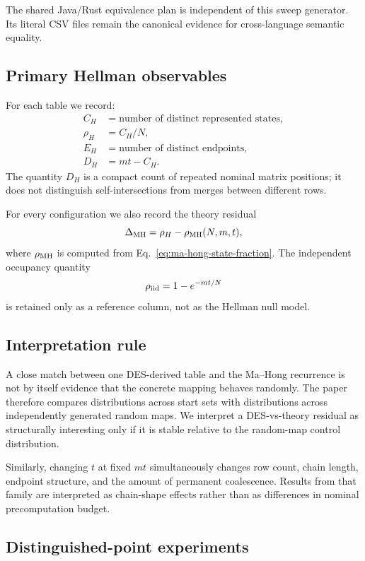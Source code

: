The shared Java/Rust equivalence plan is independent of this sweep generator.
Its literal CSV files remain the canonical evidence for cross-language
semantic equality.

\subsection{Primary Hellman observables}

For each table we record:
\[
\begin{aligned}
 C_H & = \text{number of distinct represented states},\\
 \rho_H & = C_H/N,\\
 E_H & = \text{number of distinct endpoints},\\
 D_H & = mt-C_H.
\end{aligned}
\]
The quantity $D_H$ is a compact count of repeated nominal matrix positions; it
does not distinguish self-intersections from merges between different rows.

For every configuration we also record the theory residual
\[
  \Delta_{\rm MH}
    =
    \rho_H-\rho_{\rm MH}(N,m,t),
\]
where $\rho_{\rm MH}$ is computed from
Eq.~\eqref{eq:ma-hong-state-fraction}.  The independent occupancy quantity
\[
  \rho_{\rm iid}=1-e^{-mt/N}
\]
is retained only as a reference column, not as the Hellman null model.

\subsection{Interpretation rule}

A close match between one DES-derived table and the Ma--Hong recurrence is not
by itself evidence that the concrete mapping behaves randomly.  The paper
therefore compares distributions across start sets with distributions across
independently generated random maps.  We interpret a DES-vs-theory residual as
structurally interesting only if it is stable relative to the random-map
control distribution.

Similarly, changing $t$ at fixed $mt$ simultaneously changes row count, chain
length, endpoint structure, and the amount of permanent coalescence.  Results
from that family are interpreted as chain-shape effects rather than as
differences in nominal precomputation budget.

\subsection{Distinguished-point experiments}

